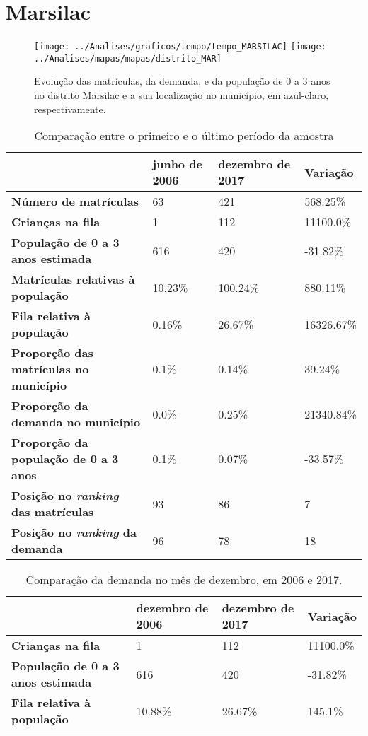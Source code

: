 \section{Marsilac}
\begin{figure}[H]
\centering
\texttt{[image: ../Analises/graficos/tempo/tempo\_MARSILAC]}
\texttt{[image: ../Analises/mapas/mapas/distrito\_MAR]}
\caption{Evolução das matrículas, da demanda, e da população de 0 a 3 anos no distrito Marsilac e a sua localização no município, em azul-claro, respectivamente.}
\end{figure}
\begin{table}[H]
\begin{tabular}{l|l|l|l}
\textbf{}                                      & \textbf{junho de 2006}       & \textbf{dezembro de 2017}    & \textbf{Variação} \\ \hline
\textbf{Número de matrículas}                  & 63 & 421 & 568.25\% \\ \hline
\textbf{Crianças na fila}                      & 1 & 112 & 11100.0\% \\ \hline
\textbf{População de 0 a 3 anos estimada}      & 616 & 420 & -31.82\% \\ \hline
\textbf{Matrículas relativas à população}      & 10.23\% & 100.24\% & 880.11\% \\ \hline
\textbf{Fila relativa à população}             & 0.16\% & 26.67\% & 16326.67\% \\ \hline
\textbf{Proporção das matrículas no município} & 0.1\% & 0.14\% & 39.24\% \\ \hline
\textbf{Proporção da demanda no município}     & 0.0\% & 0.25\% & 21340.84\% \\ \hline
\textbf{Proporção da população de 0 a 3 anos}  & 0.1\% & 0.07\% & -33.57\% \\ \hline
\textbf{Posição no \textit{ranking} das matrículas}     & 93 & 86 & 7 \\ \hline
\textbf{Posição no \textit{ranking} da demanda}         & 96 & 78 & 18 \\ 
\end{tabular}
\caption{Comparação entre o primeiro e o último período da amostra}
\end{table}
\begin{table}[H]
\begin{tabular}{l|l|l|l}
\textbf{}                                 & \textbf{dezembro de 2006} & \textbf{dezembro de 2017} & \textbf{Variação} \\ \hline
\textbf{Crianças na fila}                      & 1 & 112 & 11100.0\% \\ \hline
\textbf{População de 0 a 3 anos estimada}      & 616 & 420 & -31.82\% \\ \hline
\textbf{Fila relativa à população}             & 10.88\% & 26.67\% & 145.1\% \\
\end{tabular}
\caption{Comparação da demanda no mês de dezembro, em 2006 e 2017.}
\end{table}
